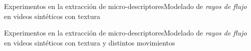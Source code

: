 \documentclass{beamer}
\begin{document}
	\begin{frame}{Experimentos en la extracción de micro-descriptores}{Modelado de \textit{rayos de flujo} en videos sintéticos con textura}
		\begin{center}
		\end{center}		
	\end{frame}	
	
	\begin{frame}{Experimentos en la extracción de micro-descriptores}{Modelado de \textit{rayos de flujo} en videos sintéticos con textura y distintos movimientos}
		\begin{center}
		\end{center}		
	\end{frame}	
	
\end{document}
